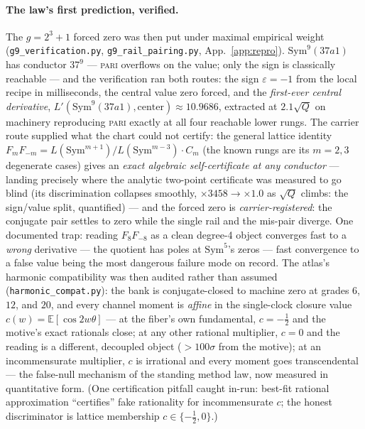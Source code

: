 \documentclass[11pt]{article}
\theoremstyle{definition}
\theoremstyle{remark}
\begin{document}
\paragraph{The law's first prediction, verified.} The $g=2^3+1$ forced zero
was then put under maximal empirical weight
(\texttt{g9\_verification.py}, \texttt{g9\_rail\_pairing.py},
App.~\ref{app:repro}). $\mathrm{Sym}^9(37a1)$ has conductor $37^9$ ---
\textsc{pari} overflows on the value; only the sign is classically
reachable --- and the verification ran both routes: the sign
$\varepsilon=-1$ from the local recipe in milliseconds, the central value
zero forced, and the \emph{first-ever central derivative},
$L'(\mathrm{Sym}^9(37a1),\text{center})\approx10.9686$, extracted at
$2.1\sqrt Q$ on machinery reproducing \textsc{pari} exactly at all four
reachable lower rungs. The carrier route supplied what the chart could not
certify: the general lattice identity
$F_mF_{-m}=L(\mathrm{Sym}^{m+1})/L(\mathrm{Sym}^{m-3})\cdot C_m$ (the
known rungs are its $m=2,3$ degenerate cases) gives an \emph{exact
algebraic self-certificate at any conductor} --- landing precisely where
the analytic two-point certificate was measured to go blind (its
discrimination collapses smoothly, $\times3458\to\times1.0$ as $\sqrt Q$
climbs: the sign/value split, quantified) --- and the forced zero is
\emph{carrier-registered}: the conjugate pair settles to zero while the
single rail and the mis-pair diverge. One documented trap: reading
$F_8F_{-8}$ as a clean degree-4 object converges fast to a \emph{wrong}
derivative --- the quotient has poles at $\mathrm{Sym}^5$'s zeros --- fast
convergence to a false value being the most dangerous failure mode on
record. The atlas's harmonic compatibility
was then audited rather than assumed (\texttt{harmonic\_compat.py}): the bank is conjugate-closed to
machine zero at grades $6$, $12$, and $20$, and every channel moment is
\emph{affine} in the single-clock closure value $c(w)=\mathbb E[\cos2w\theta]$
--- at the fiber's own fundamental, $c=-\tfrac12$ and the motive's exact
rationals close; at any other rational multiplier, $c=0$ and the reading is a
different, decoupled object ($>100\sigma$ from the motive); at an
incommensurate multiplier, $c$ is irrational and every moment goes
transcendental --- the false-null mechanism of the standing method law, now
measured in quantitative form. (One certification pitfall caught in-run:
best-fit rational approximation ``certifies'' fake rationality for
incommensurate $c$; the honest discriminator is lattice membership
$c\in\{-\tfrac12,0\}$.)
\end{document}
